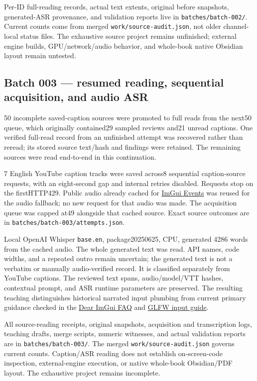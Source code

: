 Per-ID full-reading records, actual text extents, original before snapshots, generated-ASR provenance, and validation reports live in \texttt{batches/batch-002/}. Current counts come from merged \texttt{work/source-audit.json}, not older channel-local status files. The exhaustive source project remains unfinished; external engine builds, GPU/network/audio behavior, and whole-book native Obsidian layout remain untested.

\subsection{Batch 003 --- resumed reading, sequential acquisition, and audio ASR}\label{batch-003-resumed-reading-sequential-acquisition-and-audio-asr}

50 incomplete saved-caption sources were promoted to full reads from the next50 queue, which originally contained29 sampled reviews and21 unread captions. One verified full-read record from an unfinished attempt was recovered rather than reread; its stored source text/hash and findings were retained. The remaining sources were read end-to-end in this continuation.

7 English YouTube caption tracks were saved across8 sequential caption-source requests, with an eight-second gap and internal retries disabled. Requests stop on the firstHTTP429. Public audio already cached for \href{https://www.youtube.com/watch?v=yBP1gSbQPPM}{ImGui Events} was reused for the audio fallback; no new request for that audio was made. The acquisition queue was capped at49 alongside that cached source. Exact source outcomes are in \texttt{batches/batch-003/attempts.json}.

Local OpenAI Whisper \texttt{base.en}, package20250625, CPU, generated 4286 words from the cached audio. The whole generated text was read. API names, code widths, and a repeated outro remain uncertain; the generated text is not a verbatim or manually audio-verified record. It is classified separately from YouTube captions. The reviewed text spans, audio/model/VTT hashes, contextual prompt, and ASR runtime parameters are preserved. The resulting teaching distinguishes historical narrated input plumbing from current primary guidance checked in the \href{https://github.com/ocornut/imgui/blob/master/docs/FAQ.md}{Dear ImGui FAQ} and \href{https://www.glfw.org/docs/latest/input_guide.html}{GLFW input guide}.

All source-reading receipts, original snapshots, acquisition and transcription logs, teaching drafts, merge scripts, numeric witnesses, and actual validation reports are in \texttt{batches/batch-003/}. The merged \texttt{work/source-audit.json} governs current counts. Caption/ASR reading does not establish on-screen-code inspection, external-engine execution, or native whole-book Obsidian/PDF layout. The exhaustive project remains incomplete.

